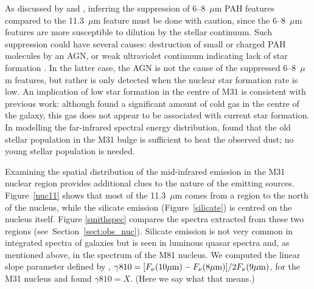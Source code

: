 As discussed by  \citet{Smith:2007lr} and \citet{Smith2010}, inferring the suppression of 6--8~$\mu$m PAH features compared
to the 11.3~$\mu$m feature must be done with caution, since the 6--8~$\mu$m features are more susceptible to dilution by the stellar
continuum. Such suppression could have several causes: destruction of small or charged PAH molecules by an AGN,
or weak ultraviolet continuum indicating lack of star formation \citep{Smith:2007lr}. In the latter case, the AGN is not the cause of
the suppressed  6--8~$\mu$m features, but rather is only detected when the nuclear star formation rate is low.
An implication of low star formation in the centre of M31 is consistent
with previous work: although \citet{Melchior2013} found a significant amount of cold gas in the centre of the galaxy, this gas does not
appear to be associated with current star formation. In modelling the far-infrared spectral energy distribution, \cite{Groves2012} found that  
the old stellar population in the M31 bulge is sufficient  to heat the observed dust; no young stellar population is needed.


Examining the spatial distribution of the mid-infrared emission in the M31 nuclear region provides additional clues
to the nature of the emitting sources. Figure~\ref{nuc11} shows that most of the 11.3~$\mu$m comes from a region to the
north of the nucleus, while the silicate emission (Figure~\ref{silicate}) is centred on the nucleus itself.  Figure \ref{smithspec}
compares the spectra extracted from these two regions (see~Section~\ref{sect:obs_nuc}). Silicate emission is not very common in
integrated spectra of galaxies \citep{Spoon2007} but is seen in luminous quasar spectra \citep{Hill14} and, as mentioned above, in the
spectrum of the M81 nucleus. We computed the linear slope parameter  defined by \citet{Smith2010},
$\gamma810 =[F_{\nu}(10\mu{\rm m}) -F_{\nu}(8\mu{\rm m})]/2F_{\nu}(9\mu{\rm m}) $, for the M31 nucleus and
found $\gamma810 =X$.  (Here we say what that means.)


